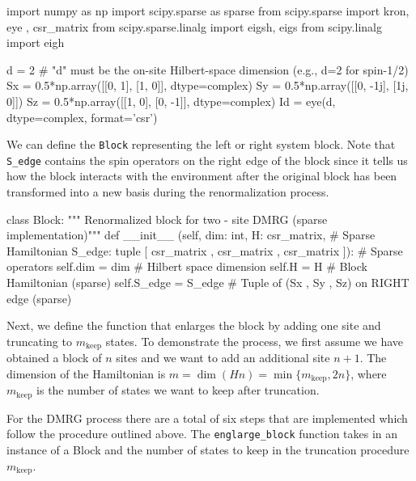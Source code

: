 \documentclass{article}
\begin{document}
\begin{python}
import numpy as np
import scipy.sparse as sparse
from scipy.sparse import kron, eye , csr_matrix
from scipy.sparse.linalg import eigsh, eigs
from scipy.linalg import eigh
\end{python}

\begin{python}
d = 2 # "d" must be the on-site Hilbert-space dimension (e.g., d=2 for spin-1/2)
Sx = 0.5*np.array([[0, 1], [1, 0]], dtype=complex)
Sy = 0.5*np.array([[0, -1j], [1j, 0]])
Sz = 0.5*np.array([[1, 0], [0, -1]], dtype=complex)
Id = eye(d, dtype=complex, format='csr')
\end{python}

\vspace{1em}

\noindent We can define the \verb|Block| representing the left or right system block. Note that \verb|S_edge| contains the spin operators on the right edge of the block since it tells us how the block interacts with the environment after the original block has been transformed into a new basis during the renormalization process.

\vspace{1em}

\begin{python}
class Block:
    """ Renormalized block for two - site DMRG (sparse implementation)"""
    def __init__ (self, dim: int, 
                  H: csr_matrix, # Sparse Hamiltonian
                  S_edge: tuple [ csr_matrix , csr_matrix , csr_matrix ]): # Sparse operators 
        self.dim = dim # Hilbert space dimension
        self.H = H # Block Hamiltonian (sparse)
        self.S_edge = S_edge # Tuple of (Sx , Sy , Sz) on RIGHT edge (sparse)
\end{python}

\vspace{1em}

\noindent Next, we define the function that enlarges the block by adding one site and truncating to $m_{\text{keep}}$ states. To demonstrate the process, we first assume we have obtained a block of $n$ sites and we want to add an additional site $n+1$. The dimension of the Hamiltonian is $m = \dim(Hn) = \min\{m_{\text{keep}}, 2n\}$, where $m_{\text{keep}}$ is the number of states we want to keep after truncation.

\vspace{1em}

\noindent For the DMRG process there are a total of six steps that are implemented which follow the procedure outlined above. The \verb|englarge_block| function takes in an instance of a Block and the number of states to keep in the truncation procedure $m_{\text{keep}}$. 
\end{document}
